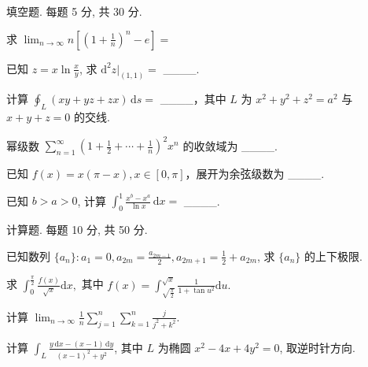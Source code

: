 \par{}
填空题. 每题 5 分, 共 30 分.\par
求 $\lim_{n\to \infty}n\left[\left(1 + \frac{1}{n}\right)^n -e\right] =$\par
已知 $z = x \ln \frac{x}{y}$, 求 $\mathrm{d}^2 z \Big|_{(1,1)} =$ \_\_\_\_.\par
计算 $\oint_{L} (xy + yz + zx) \, \mathrm{d}s =$ \_\_\_\_，其中 $L$ 为 $x^{2} + y^{2} + z^{2} = a^{2}$ 与 $x + y + z = 0$ 的交线.\par
幂级数  $\sum_{n=1}^{\infty}\left(1+\frac{1}{2}+\cdots+\frac{1}{n}\right)^{2}x^{n}$  的收敛域为 \_\_\_\_.\par
已知 $f(x) = x(\pi - x), x \in [0, \pi]$，展开为余弦级数为 \_\_\_\_.\par
已知 $b > a > 0$, 计算 $\int_0^1 \frac{x^b - x^a}{\ln x} \, \mathrm{d}x =$ \_\_\_\_.\par
\par{}
计算题. 每题 10 分, 共 50 分.\par
已知数列 $\{a_{n}\}: a_{1} = 0, a_{2m} = \frac{a_{2m - 1}}{2}, a_{2m + 1} = \frac{1}{2} + a_{2m}$, 求 $\{a_{n}\}$ 的上下极限.\par
求 $\int_0^{\frac{\pi}{2}}\frac{f(x)}{\sqrt{x}}\mathrm{d}x,$ 其中 $f(x) = \int_{\sqrt{\frac{\pi}{2}}}^{\sqrt{x}}\frac{1}{1 + \tan u^2}\mathrm{d}u.$\par
计算 $\lim_{n\to \infty}\frac{1}{n}\sum_{j = 1}^{n}\sum_{k = 1}^{n}\frac{j}{j^2 + k^2}.$\par
计算 $\int_{L} \frac{y \, \mathrm{d}x - (x - 1) \, \mathrm{d}y}{(x - 1)^2 + y^2}$, 其中 $L$ 为椭圆 $x^2 - 4x + 4y^2 = 0$, 取逆时针方向.\par
